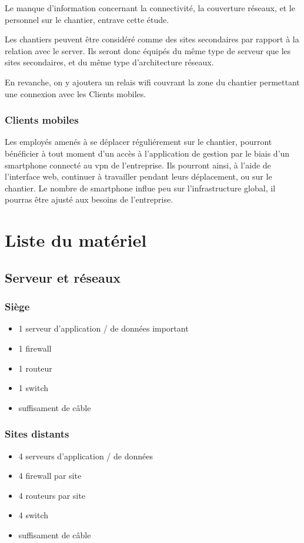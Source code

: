             Le manque d'information concernant la connectivité, la couverture réseaux, et le personnel sur le chantier, entrave cette étude.

            Les chantiers peuvent être considéré comme des sites secondaires par rapport à la relation avec le server.
            Ils seront donc équipés du même type de serveur que les sites secondaires, et du même type d'architecture réseaux.

            En revanche, on y ajoutera un relais wifi couvrant la zone du chantier permettant une connexion avec les Clients mobiles.
   
        \subsubsection{Clients mobiles}
            Les employés amenés à se déplacer réguliérement sur le chantier, pourront bénéficier à tout moment d'un accès à l'application de gestion par le biais d'un smartphone connecté au vpn de l'entreprise.
            Ils pourront ainsi, à l'aide de l'interface web, continuer à travailler pendant leurs déplacement, ou sur le chantier.
            Le nombre de smartphone influe peu sur l'infrastructure global, il pourras être ajusté aux besoins de l'entreprise.

\section{Liste du matériel}

    \subsection{Serveur et réseaux}
        \subsubsection{Siège}
            \begin{itemize}
	            \item 1 serveur d'application / de données important
                \item 1 firewall
	            \item 1 routeur 
                \item 1 switch
                \item suffisament de câble
            \end{itemize}

        \subsubsection{Sites distants}
            \begin{itemize}
	            \item 4 serveurs d'application / de données
                \item 4 firewall par site
	            \item 4 routeurs par site
                \item 4 switch
                \item suffisament de câble
            \end{itemize}

